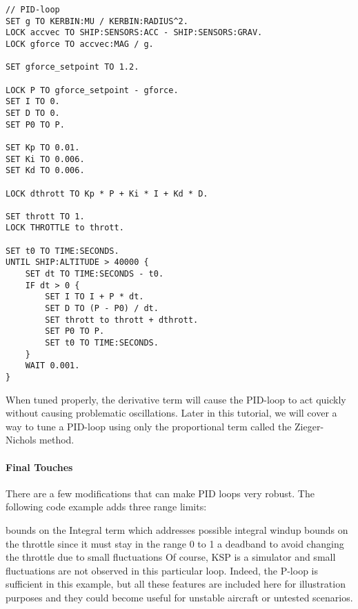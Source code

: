\begin{Verbatim}[frame=single]
// PID-loop
SET g TO KERBIN:MU / KERBIN:RADIUS^2.
LOCK accvec TO SHIP:SENSORS:ACC - SHIP:SENSORS:GRAV.
LOCK gforce TO accvec:MAG / g.

SET gforce_setpoint TO 1.2.

LOCK P TO gforce_setpoint - gforce.
SET I TO 0.
SET D TO 0.
SET P0 TO P.

SET Kp TO 0.01.
SET Ki TO 0.006.
SET Kd TO 0.006.

LOCK dthrott TO Kp * P + Ki * I + Kd * D.

SET thrott TO 1.
LOCK THROTTLE to thrott.

SET t0 TO TIME:SECONDS.
UNTIL SHIP:ALTITUDE > 40000 {
    SET dt TO TIME:SECONDS - t0.
    IF dt > 0 {
        SET I TO I + P * dt.
        SET D TO (P - P0) / dt.
        SET thrott to thrott + dthrott.
        SET P0 TO P.
        SET t0 TO TIME:SECONDS.
    }
    WAIT 0.001.
}
\end{Verbatim} 

When tuned properly, the derivative term will cause the PID-loop to act quickly without causing problematic oscillations. Later in this tutorial, we will cover a way to tune a PID-loop using only the proportional term called the Zieger-Nichols method.

\paragraph{Final Touches}
There are a few modifications that can make PID loops very robust. The following code example adds three range limits:

bounds on the Integral term which addresses possible integral windup
bounds on the throttle since it must stay in the range 0 to 1
a deadband to avoid changing the throttle due to small fluctuations
Of course, KSP is a simulator and small fluctuations are not observed in this particular loop. Indeed, the P-loop is sufficient in this example, but all these features are included here for illustration purposes and they could become useful for unstable aircraft or untested scenarios.

